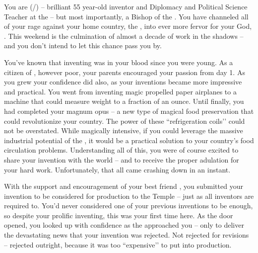 \documentclass[char]{GL2020}
\begin{document}
\name{\cChupInventor{}}


You are \cChupInventor{\full} (\cChupInventor{\they}/\cChupInventor{\them}) -- brilliant 55 year-old inventor and Diplomacy and Political Science Teacher at the \pSchool{} -- but most importantly, a Bishop of the \pGoaties{}. You have channeled all of your rage against your home country, the \pTech{}, into ever more fervor for your God, \cGenesis{}. This weekend is the culmination of almost a decade of work in the shadows -- and you don’t intend to let this chance pass you by.


You’ve known that inventing was in your blood since you were young. As a citizen of \pTech{}, however poor, your parents encouraged your passion from day 1. As you grew your confidence did also, as your inventions became more impressive and practical. You went from inventing magic propelled paper airplanes to a machine that could measure weight to a fraction of an ounce. Until finally, you had completed your magnum opus -- a new type of magical food preservation that could revolutionize your country. The power of these ``refrigeration coils’’ could not be overstated. While magically intensive, if you could leverage the massive industrial potential of the \pTech{}, it would be a practical solution to your country’s food circulation problems. Understanding all of this, you were of course excited to share your invention with the world -- and to receive the proper adulation for your hard work. Unfortunately, that all came crashing down in an instant.

With the support and encouragement of your best friend \cHeadScientist{}, you submitted your invention to be considered for production to the Temple -- just as all inventors are required to. You’d never considered one of your previous inventions to be enough, so despite your prolific inventing, this was your first time here. As the door opened, you looked up with confidence as the \cAntiChup{\cleric} approached you -- only to deliver the devastating news that your invention was rejected. Not rejected for revisions -- rejected outright, because it was too ``expensive’’ to put into production. 
\end{document}
